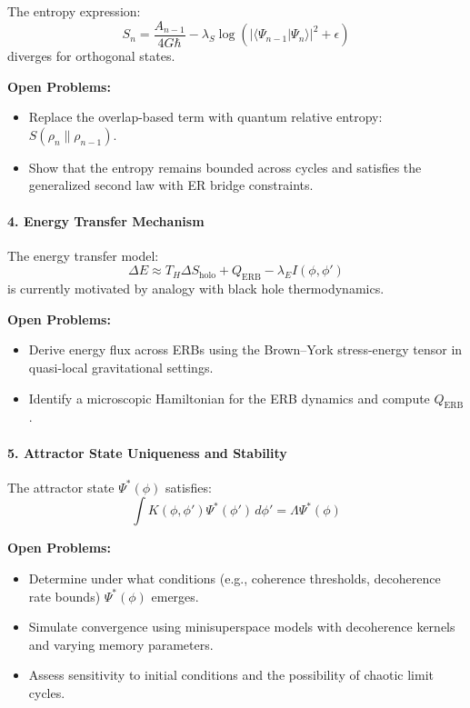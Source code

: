 The entropy expression:
\[
S_n = \frac{A_{n-1}}{4G\hbar} - \lambda_S \log\left(|\langle \Psi_{n-1} | \Psi_n \rangle|^2 + \epsilon\right)
\]
diverges for orthogonal states.

\textbf{Open Problems:}
\begin{itemize}
    \item Replace the overlap-based term with quantum relative entropy: \( S(\rho_n \| \rho_{n-1}) \).
    \item Show that the entropy remains bounded across cycles and satisfies the generalized second law with ER bridge constraints.
\end{itemize}

\paragraph{4. Energy Transfer Mechanism}

The energy transfer model:
\[
\Delta E \approx T_H \Delta S_{\text{holo}} + Q_{\text{ERB}} - \lambda_E I(\phi, \phi')
\]
is currently motivated by analogy with black hole thermodynamics.

\textbf{Open Problems:}
\begin{itemize}
    \item Derive energy flux across ERBs using the Brown–York stress-energy tensor in quasi-local gravitational settings.
    \item Identify a microscopic Hamiltonian for the ERB dynamics and compute \( Q_{\text{ERB}} \).
\end{itemize}

\paragraph{5. Attractor State Uniqueness and Stability}

The attractor state \( \Psi^*(\phi) \) satisfies:
\[
\int K(\phi, \phi') \Psi^*(\phi') \, d\phi' = \Lambda \Psi^*(\phi)
\]

\textbf{Open Problems:}
\begin{itemize}
    \item Determine under what conditions (e.g., coherence thresholds, decoherence rate bounds) \( \Psi^*(\phi) \) emerges.
    \item Simulate convergence using minisuperspace models with decoherence kernels and varying memory parameters.
    \item Assess sensitivity to initial conditions and the possibility of chaotic limit cycles.
\end{itemize}

